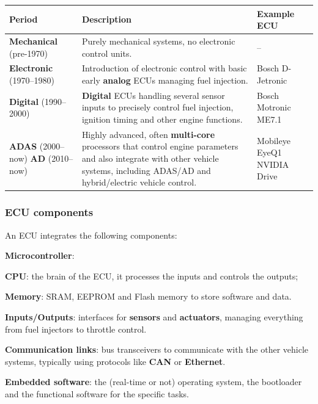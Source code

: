 \begin{table}[H]
    \centering
    \begin{tabular}{|p{3.3cm}|p{8.7cm}|p{3.3cm}|}
        \hline
        \textbf{Period} & \textbf{Description} & \textbf{Example ECU} \\
        \hline
        \textbf{Mechanical} (pre-1970) & Purely mechanical systems, no electronic control units. & -- \\
        \hline
        \textbf{Electronic} (1970--1980) & Introduction of electronic control with basic early \textbf{analog} ECUs managing fuel injection. & Bosch D-Jetronic \\
        \hline
        \textbf{Digital} (1990--2000) & \textbf{Digital} ECUs handling several sensor inputs to precisely control fuel injection, ignition timing and other engine functions. & Bosch Motronic ME7.1 \\
        \hline
        \textbf{ADAS} (2000--now) \newline \textbf{AD} (2010--now) & Highly advanced, often \textbf{multi-core} processors that control engine parameters and also integrate with other vehicle systems, including ADAS/AD and hybrid/electric vehicle control. & Mobileye EyeQ1 \newline NVIDIA Drive \\
        \hline
    \end{tabular}
\end{table}

\subsubsection{ECU components}
An ECU integrates the following components:
\begin{compactitemize}
    \item \textbf{Microcontroller}:
    \begin{compactitemize}
        \item \textbf{CPU}: the brain of the ECU, it processes the inputs and controls the outputs;
        \item \textbf{Memory}: SRAM, EEPROM and Flash memory to store software and data.
    \end{compactitemize}
    \item \textbf{Inputs/Outputs}: interfaces for \textbf{sensors} and \textbf{actuators}, managing everything from fuel injectors to throttle control.
    \item \textbf{Communication links}: bus transceivers to communicate with the other vehicle systems, typically using protocols like \textbf{CAN} or \textbf{Ethernet}.
    \item \textbf{Embedded software}: the (real-time or not) operating system, the bootloader and the functional software for the specific tasks.
\end{compactitemize}

